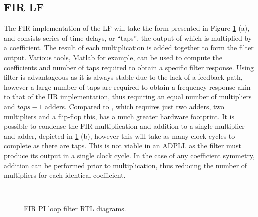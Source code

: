\subsection{\acs{FIR} \acl{LF}}
The \acl{FIR} implementation of the \acl{LF} will take the form presented in Figure \ref{fig:fir_pi} (a), and consists series of time delays, or ``taps'', the output of which is multiplied by a coefficient. The result of each multiplication is added together to form the filter output. Various tools, Matlab for example, can be used to compute the coefficients and number of taps required to obtain a specific filter response. Using  filter is advantageous as it is always stable due to the lack of a feedback path, however a large number of taps are required to obtain a frequency response akin to that of the \ac{IIR} implementation, thus requiring an equal number of multipliers and $taps-1$ adders. Compared to , which requires just two adders, two multipliers and a flip-flop this, has a much greater hardware footprint. It is possible to condense the \ac{FIR} multiplication and addition to a single multiplier and adder, depicted in \ref{fig:fir_pi} (b), however this will take as many clock cycles to complete as there are taps. This is not viable in an \ac{ADPLL} as the filter must produce its output in a single clock cycle. In the case of any coefficient symmetry, addition can be performed prior to multiplication, thus reducing the number of multipliers for each identical coefficient.
\begin{figure}[h]
	\centering
	\\
	\caption[\ac{FIR} \ac{PI} loop filter RTL diagrams]{\ac{FIR} \ac{PI} loop filter RTL diagrams.}
	\label{fig:fir_pi}
\end{figure}

